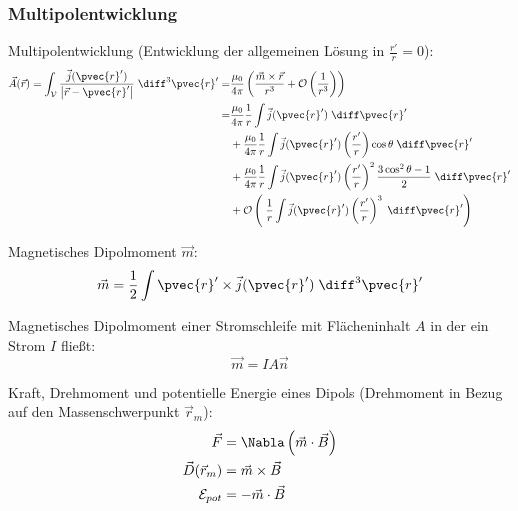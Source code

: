 \documentclass[11pt]{article}
\numberwithin{equation}{section}
\begin{document}
			\subsubsection{Multipolentwicklung}
				\noindent
				Multipolentwicklung (Entwicklung der allgemeinen Lösung in $\frac{r'}{r}=0$):
				\begin{equation}
					\begin{aligned}
						\vec{A}(\vec{r}) = \int_{\mathcal{V}} \frac{\vec{j}(\pvec{r}')}{\left|\vec{r}-\pvec{r}'\right|} \;\diff^3\pvec{r}'
						=& \frac{\mu_0}{4\pi} \left(\frac{\vec{m}\times\vec{r}}{r^3} + \mathcal{O}\left(\frac{1}{r^3}\right)\right) \\
						=& \frac{\mu_0}{4\pi}\frac{1}{r}\int\vec{j}(\pvec{r}')\;\diff \pvec{r}' \\
						&+ \frac{\mu_0}{4\pi}\frac{1}{r}\int\vec{j}(\pvec{r}')\left(\frac{r'}{r}\right)\cos\theta\;\diff \pvec{r}' \\
						&+ \frac{\mu_0}{4\pi}\frac{1}{r}\int\vec{j}(\pvec{r}')\left(\frac{r'}{r}\right)^2\frac{3\cos^2\theta-1}{2}\;\diff \pvec{r}' \\
						&+ \mathcal{O}\left(\;\frac{1}{r}\int\vec{j}(\pvec{r}')\left(\frac{r'}{r}\right)^3 \;\diff \pvec{r}'\right) \\
					\end{aligned}
				\end{equation}

				\noindent
				Magnetisches Dipolmoment $\vec{m}$:
				\begin{equation}
					\begin{aligned}
						\vec{m} = \frac{1}{2}\int \pvec{r}'\times\vec{j}(\pvec{r}')\;\diff^3\pvec{r}'
					\end{aligned}
				\end{equation}

				\noindent
				Magnetisches Dipolmoment einer Stromschleife mit Flächeninhalt $A$ in der ein Strom $I$ fließt:
				\begin{equation}
					\vec{m} = IA\vec{n}
				\end{equation}

				\noindent
				Kraft, Drehmoment und potentielle Energie eines Dipols (Drehmoment in Bezug auf den Massenschwerpunkt $\vec{r}_m$):
				\begin{equation}
					\begin{aligned}
						\vec{F} &= \Nabla\left(\vec{m}\cdot\vec{B}\right) \\
						\vec{D}(\vec{r}_m) &= \vec{m}\times\vec{B} \\
						\mathcal{E}_{pot} &= -\vec{m}\cdot\vec{B} \\
					\end{aligned}
				\end{equation}
\end{document}
